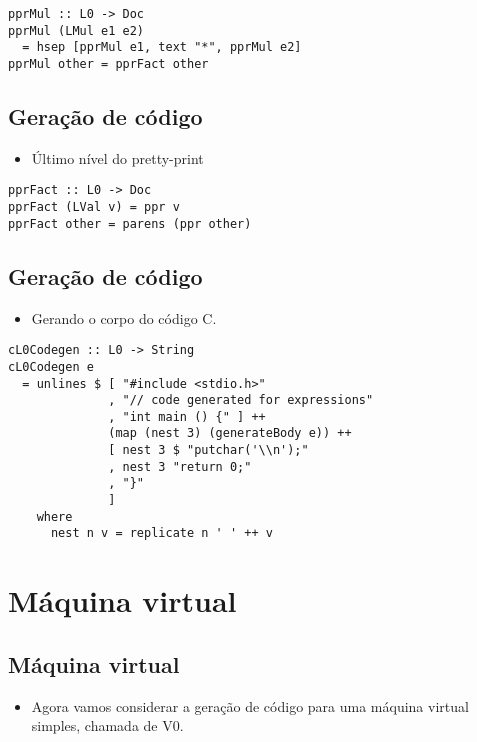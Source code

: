 \documentclass[11pt]{article}
\begin{document}
\begin{verbatim}
pprMul :: L0 -> Doc 
pprMul (LMul e1 e2) 
  = hsep [pprMul e1, text "*", pprMul e2]
pprMul other = pprFact other 
\end{verbatim}
\subsection*{Geração de código}
\label{sec:orgac7dd1d}

\begin{itemize}
\item Último nível do pretty-print
\end{itemize}

\begin{verbatim}
pprFact :: L0 -> Doc
pprFact (LVal v) = ppr v 
pprFact other = parens (ppr other)
\end{verbatim}
\subsection*{Geração de código}
\label{sec:org44e0011}

\begin{itemize}
\item Gerando o corpo do código C.
\end{itemize}

\begin{verbatim}
cL0Codegen :: L0 -> String 
cL0Codegen e 
  = unlines $ [ "#include <stdio.h>"
              , "// code generated for expressions"
              , "int main () {" ] ++
              (map (nest 3) (generateBody e)) ++
              [ nest 3 $ "putchar('\\n');"
              , nest 3 "return 0;"
              , "}"
              ] 
    where
      nest n v = replicate n ' ' ++ v
\end{verbatim}
\section*{Máquina virtual}
\label{sec:org3b3e97d}

\subsection*{Máquina virtual}
\label{sec:org6266fb4}

\begin{itemize}
\item Agora vamos considerar a geração de código para uma máquina virtual simples, chamada de V0.
\end{itemize}
\end{document}
